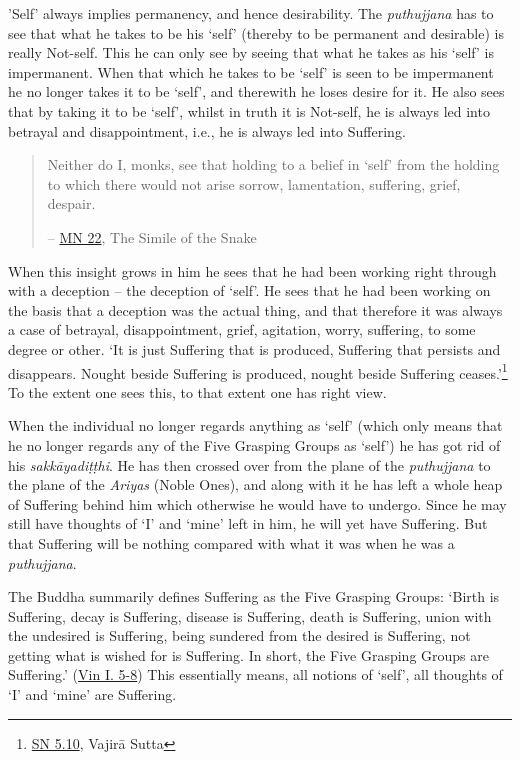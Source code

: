 \protect\hypertarget{impermanent}{}{}'Self' always implies permanency, and hence desirability. The \textit{puthujjana} has to see that what he takes to be his `self' (thereby to be permanent and desirable) is really Not-self. This he can only see by seeing that what he takes as his `self' is impermanent. When that which he takes to be `self' is seen to be impermanent he no longer takes it to be `self', and therewith he loses desire for it. He also sees that by taking it to be `self', whilst in truth it is Not-self, he is always led into betrayal and disappointment, i.e., he is always led into Suffering.

\begin{quote}
Neither do I, monks, see that holding to a belief in `self' from the holding to which there would not arise sorrow, lamentation, suffering, grief, despair.

 -- \href{https://suttacentral.net/mn22/en/bodhi}{MN 22}, The Simile of the Snake
\end{quote}

When this insight grows in him he sees that he had been working right through with a deception -- the deception of `self'. He sees that he had been working on the basis that a deception was the actual thing, and that therefore it was always a case of betrayal, disappointment, grief, agitation, worry, suffering, to some degree or other. `It is just Suffering that is produced, Suffering that persists and disappears. Nought beside Suffering is produced, nought beside Suffering ceases.'\footnote{\href{https://suttacentral.net/sn5.10/en/bodhi}{SN 5.10}, Vajirā Sutta} To the extent one sees this, to that extent one has right view.

When the individual no longer regards anything as `self' (which only means that he no longer regards any of the Five Grasping Groups as `self') he has got rid of his \textit{sakkāyadiṭṭhi}. He has then crossed over from the plane of the \textit{puthujjana} to the plane of the \textit{Ariyas} (Noble Ones), and along with it he has left a whole heap of Suffering behind him which otherwise he would have to undergo. Since he may still have thoughts of `I' and `mine' left in him, he will yet have Suffering. But that Suffering will be nothing compared with what it was when he was a \textit{puthujjana}.

The Buddha summarily defines Suffering as the Five Grasping Groups: `Birth is Suffering, decay is Suffering, disease is Suffering, death is Suffering, union with the undesired is Suffering, being sundered from the desired is Suffering, not getting what is wished for is Suffering. In short, the Five Grasping Groups are Suffering.' (\href{https://suttacentral.net/pli-tv-kd1/en/brahmali}{Vin I. 5-8}) This essentially means, all notions of `self', all thoughts of `I' and `mine' are Suffering.

